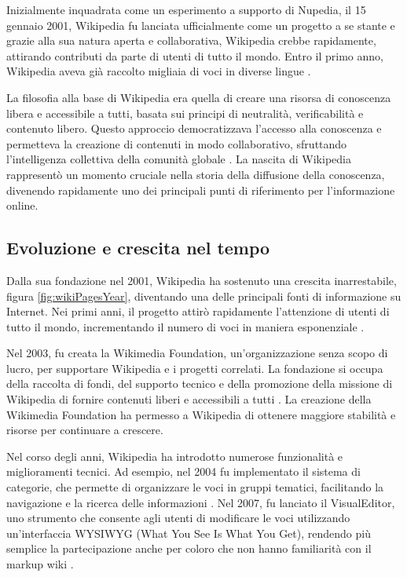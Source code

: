 \documentclass[12pt,a4paper]{report}
\begin{document}
Inizialmente inquadrata come un esperimento a supporto di Nupedia, il 15 gennaio 2001, Wikipedia fu lanciata ufficialmente come un progetto a se stante e grazie alla sua natura aperta e collaborativa, Wikipedia crebbe rapidamente, attirando contributi da parte di utenti di tutto il mondo. Entro il primo anno, Wikipedia aveva già raccolto migliaia di voci in diverse lingue \cite{jemielniak2014wikipedia}.

La filosofia alla base di Wikipedia era quella di creare una risorsa di conoscenza libera e accessibile a tutti, basata sui principi di neutralità, verificabilità e contenuto libero. Questo approccio democratizzava l'accesso alla conoscenza e permetteva la creazione di contenuti in modo collaborativo, sfruttando l'intelligenza collettiva della comunità globale \cite{denning2005wikipedia}. La nascita di Wikipedia rappresentò un momento cruciale nella storia della diffusione della conoscenza, divenendo rapidamente uno dei principali punti di riferimento per l'informazione online.

\subsection{Evoluzione e crescita nel tempo}

Dalla sua fondazione nel 2001, Wikipedia ha sostenuto una crescita inarrestabile, figura \cref{fig:wikiPagesYear}, diventando una delle principali fonti di informazione su Internet. Nei primi anni, il progetto attirò rapidamente l'attenzione di utenti di tutto il mondo, incrementando il numero di voci in maniera esponenziale \cite{lih2009wikipedia}.

Nel 2003, fu creata la Wikimedia Foundation, un'organizzazione senza scopo di lucro, per supportare Wikipedia e i progetti correlati. La fondazione si occupa della raccolta di fondi, del supporto tecnico e della promozione della missione di Wikipedia di fornire contenuti liberi e accessibili a tutti \cite{reagle2010good}. La creazione della Wikimedia Foundation ha permesso a Wikipedia di ottenere maggiore stabilità e risorse per continuare a crescere.

Nel corso degli anni, Wikipedia ha introdotto numerose funzionalità e miglioramenti tecnici. Ad esempio, nel 2004 fu implementato il sistema di categorie, che permette di organizzare le voci in gruppi tematici, facilitando la navigazione e la ricerca delle informazioni \cite{jemielniak2014wikipedia}. Nel 2007, fu lanciato il VisualEditor, uno strumento che consente agli utenti di modificare le voci utilizzando un'interfaccia WYSIWYG (What You See Is What You Get), rendendo più semplice la partecipazione anche per coloro che non hanno familiarità con il markup wiki \cite{history_of_wikis}.
\end{document}
